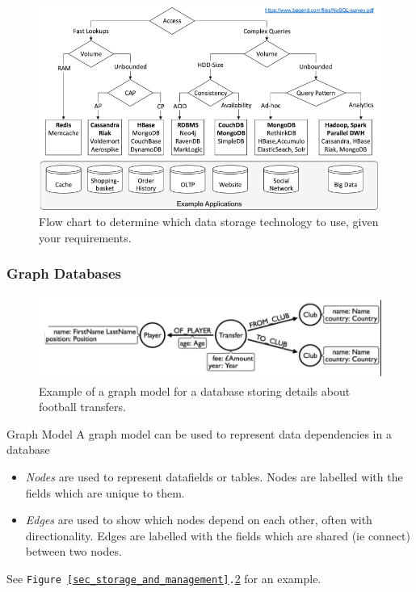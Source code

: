 \documentclass[11pt,a4paper]{article}
\begin{document}
  \begin{figure}[H]
    \centering
    \includegraphics[width=.7\textwidth]{DataStorageFlowChart.PNG}
    \caption{Flow chart to determine which data storage technology to use, given your requirements.}
    \label{fig_DataStorageFlowChart}
  \end{figure}

\subsubsection{Graph Databases}

  \begin{figure}[H]
    \centering\includegraphics[width=.7\textwidth]{GraphModel.PNG}
    \caption{Example of a graph model for a database storing details about football transfers.}
    \label{fig_graph_model}
  \end{figure}

  \begin{definition}{Graph Model}
    A graph model can be used to represent data dependencies in a database
    \begin{itemize}
      \item \textit{Nodes} are used to represent datafields or tables. Nodes are labelled with the fields which are unique to them.
      \item \textit{Edges} are used to show which nodes depend on each other, often with directionality. Edges are labelled with the fields which are shared (ie connect) between two nodes.
    \end{itemize}
    See \texttt{Figure \ref{sec_storage_and_management}.\ref{fig_graph_model}} for an example.
  \end{definition}
\end{document}
